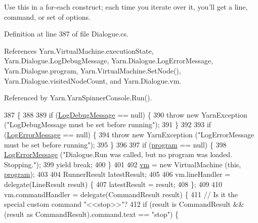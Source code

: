Use this in a for-\/each construct; each time you iterate over it, you'll get a line, command, or set of options. 



Definition at line 387 of file Dialogue.\-cs.



References Yarn.\-Virtual\-Machine.\-execution\-State, Yarn.\-Dialogue.\-Log\-Debug\-Message, Yarn.\-Dialogue.\-Log\-Error\-Message, Yarn.\-Dialogue.\-program, Yarn.\-Virtual\-Machine.\-Set\-Node(), Yarn.\-Dialogue.\-visited\-Node\-Count, and Yarn.\-Dialogue.\-vm.



Referenced by Yarn.\-Yarn\-Spinner\-Console.\-Run().


\begin{DoxyCode}
387                                                                                              \{
388 
389             \textcolor{keywordflow}{if} (\hyperlink{a00094_a381f48bb0fbb294f8cf44ca57f11be31}{LogDebugMessage} == null) \{
390                 \textcolor{keywordflow}{throw} \textcolor{keyword}{new} YarnException (\textcolor{stringliteral}{"LogDebugMessage must be set before running"});
391             \}
392 
393             \textcolor{keywordflow}{if} (\hyperlink{a00094_a9801e83dd044d6498fdf6ebcc6bec5ac}{LogErrorMessage} == null) \{
394                 \textcolor{keywordflow}{throw} \textcolor{keyword}{new} YarnException (\textcolor{stringliteral}{"LogErrorMessage must be set before running"});
395             \}
396 
397             \textcolor{keywordflow}{if} (\hyperlink{a00094_a0a1cca92325f430425d784d416cb5c2b}{program} == null) \{
398                 \hyperlink{a00094_a9801e83dd044d6498fdf6ebcc6bec5ac}{LogErrorMessage} (\textcolor{stringliteral}{"Dialogue.Run was called, but no program was loaded.
       Stopping."});
399                 yield \textcolor{keywordflow}{break};
400             \}
401 
402             \hyperlink{a00094_a8c1319357a9df6cff051328fb33224c7}{vm} = \textcolor{keyword}{new} VirtualMachine (\textcolor{keyword}{this}, \hyperlink{a00094_a0a1cca92325f430425d784d416cb5c2b}{program});
403 
404             RunnerResult latestResult;
405 
406             vm.lineHandler = delegate(LineResult result) \{
407                 latestResult = result;
408             \};
409 
410             vm.commandHandler = delegate(CommandResult result) \{
411                 \textcolor{comment}{// Is it the special custom command "<<stop>>"?}
412                 \textcolor{keywordflow}{if} (result is CommandResult && (result as CommandResult).command.text == \textcolor{stringliteral}{"stop"}) \{

\end{DoxyCode}
